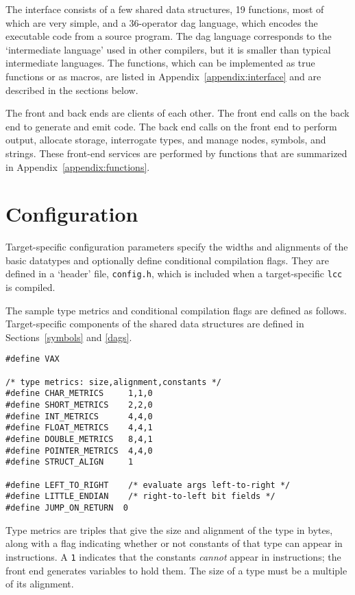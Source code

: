 The interface consists of a few shared data structures, 19 functions,
most of which are very simple, and a 36-operator dag language, which
encodes the executable code from a source program. The dag language
corresponds to the `intermediate language' used in other compilers, but
it is smaller than typical intermediate languages.
The functions, which can be implemented as true functions or as macros,
are listed in Appendix~\ref{appendix:interface} and are
described in the sections below.

The front and back ends are clients of each other.  The front end calls
on the back end to generate and emit code.  The back end calls on the
front end to perform output, allocate storage, interrogate types, and
manage nodes, symbols, and strings. These front-end services are
performed by functions that are summarized in Appendix~\ref{appendix:functions}.


\section{Configuration}

\label{configuration}
Target-specific configuration parameters specify the widths and
alignments of the basic datatypes and optionally define conditional
compilation flags.  They are defined in a `header' file, \verb|config.h|,
which is included when a target-specific \verb|lcc| is compiled.

The sample type metrics
and conditional compilation flags are defined as follows.
Target-specific components of the shared data structures
are defined in Sections~\ref{symbols} and \ref{dags}.
\begin{verbatim}
#define VAX

/* type metrics: size,alignment,constants */
#define CHAR_METRICS     1,1,0
#define SHORT_METRICS    2,2,0
#define INT_METRICS      4,4,0
#define FLOAT_METRICS    4,4,1
#define DOUBLE_METRICS   8,4,1
#define POINTER_METRICS  4,4,0
#define STRUCT_ALIGN     1

#define LEFT_TO_RIGHT    /* evaluate args left-to-right */
#define LITTLE_ENDIAN    /* right-to-left bit fields */
#define JUMP_ON_RETURN  0
\end{verbatim}

Type metrics are triples that give the size and alignment of the type
in bytes, along with a flag indicating whether or not constants of that
type can appear in instructions. A \verb|1| indicates that the
constants {\em cannot} appear in instructions; the front end generates
variables to hold them. The size of a type must be a multiple of its alignment.

